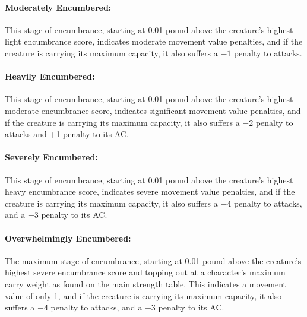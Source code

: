 \begin{multicols}{2}
\paragraph{Moderately Encumbered:} This stage of encumbrance, starting at 0.01 pound above the creature's highest light encumbrance score, indicates moderate movement value penalties, and if the creature is carrying its maximum capacity, it also suffers a $-1$ penalty to attacks.

\paragraph{Heavily Encumbered:} This stage of encumbrance, starting at 0.01 pound above the creature's highest moderate encumbrance score, indicates significant movement value penalties, and if the creature is carrying its maximum capacity, it also suffers a $-2$ penalty to attacks and +1 penalty to its AC.

\paragraph{Severely Encumbered:} This stage of encumbrance, starting at 0.01 pound above the creature's highest heavy encumbrance score, indicates severe movement value penalties, and if the creature is carrying its maximum capacity, it also suffers a $-4$ penalty to attacks, and a +3 penalty to its AC.

\paragraph{Overwhelmingly Encumbered:} The maximum stage of encumbrance, starting at 0.01 pound above the creature's highest severe encumbrance score and topping out at a character's maximum carry weight as found on the main strength table. This indicates a movement value of only 1, and if the creature is carrying its maximum capacity, it also suffers a $-4$ penalty to attacks, and a +3 penalty to its AC.

\end{multicols}

